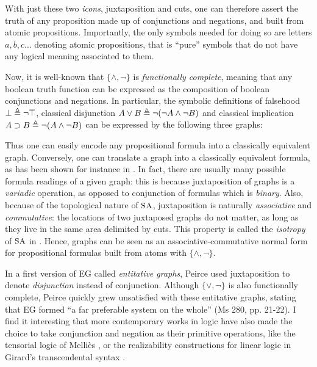 With just these two \emph{icons}, juxtaposition and cuts, one can therefore
assert the truth of any proposition made up of conjunctions and negations, and
built from atomic propositions. Importantly, the only symbols needed for doing
so are letters $a, b, c\ldots$ denoting atomic propositions, that is ``pure''
symbols that do not have any logical meaning associated to them.

Now, it is well-known that $\{\land,\neg\}$ is \emph{functionally complete},
meaning that any boolean truth function can be expressed as the composition of
boolean conjunctions and negations. In particular, the symbolic definitions of
falsehood $\bot \triangleq \neg\top$, classical disjunction $A \lor B \triangleq
\neg(\neg A \land \neg B)$ and classical implication $A \supset B \triangleq \neg (A
\land \neg B)$ can be expressed by the following three graphs:
Thus one can easily encode any propositional formula into a classically
equivalent graph. Conversely, one can translate a graph into a classically
equivalent formula, as has been shown for instance in
. In fact, there are usually many
possible formula readings of a given graph: this is because juxtaposition of
graphs is a \emph{variadic} operation, as opposed to conjunction of formulas
which is \emph{binary}. Also, because of the topological nature of $\small\textsc{SA}$,
juxtaposition is naturally \emph{associative} and \emph{commutative}: the
locations of two juxtaposed graphs do not matter, as long as they live in the
same area delimited by cuts. This property is called the \emph{isotropy} of
$\small\textsc{SA}$ in \cite{minghui_graphical_2019}. Hence, graphs can be seen as an
associative-commutative normal form for propositional formulas built from atoms
with $\{\land,\neg\}$.

\begin{remark}
  
  In a first version of EG called \emph{entitative graphs}, Peirce used
  juxtaposition to denote \emph{disjunction} instead of conjunction. Although
  $\{\lor,\neg\}$ is also functionally complete, Peirce quickly grew unsatisfied
  with these entitative graphs, stating that EG formed ``a far preferable system
  on the whole'' (Ms 280, pp. 21-22). I find it interesting that more
  contemporary works in logic have also made the choice to take conjunction and
  negation as their primitive operations, like the tensorial logic of Melliès
  \cite{mellies_micrological_2017}, or the realizability constructions for
  linear logic in Girard's transcendental syntax \cite{eng_stellar_2020}.
\end{remark}

